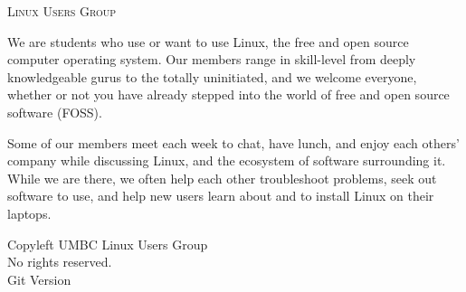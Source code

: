\documentclass[11pt]{article}
\newcommand{\foss}{FOSS}
\begin{document}
\begin{multicols*}{2}

\begin{center} \scshape \Huge
    \phantom{x}
    Linux Users Group
    \vspace{0.25in}
\end{center}

We are students who use or want to use Linux, the free and open source computer
operating system. Our members range in skill-level from deeply knowledgeable
gurus to the totally uninitiated, and we welcome everyone, whether or not you
have already stepped into the world of free and open source software (\foss).

Some of our members meet each week to chat, have lunch, and enjoy each others'
company while discussing Linux, and the ecosystem of software surrounding it.
While we are there, we often help each other troubleshoot problems, seek out
software to use, and help new users learn about and to install Linux on their
laptops.

\vfill
\phantom{x}
\columnbreak{}

\lipsum[1-4]

\phantom{x}
\vfill
\begin{center} \tiny
    \textcopyleft{} Copyleft \the\year{} UMBC Linux Users Group \\
    No rights reserved. \\
    Git Version 
\end{center}
\end{multicols*}
\end{document}
